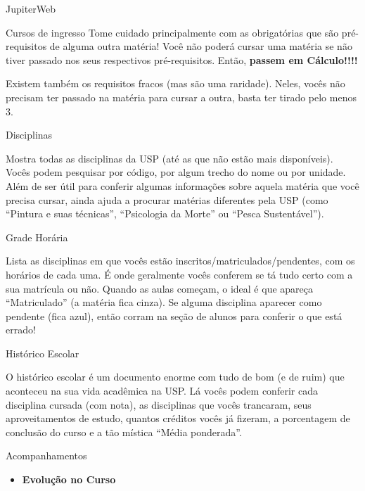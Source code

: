 \begin{secao}{JupiterWeb}
\begin{subsecao}{Cursos de ingresso}
Tome cuidado principalmente com as obrigatórias que são pré-requisitos de
alguma outra matéria! Você não poderá cursar uma matéria se não tiver passado
nos seus respectivos pré-requisitos. Então, \textbf{passem em Cálculo!!!!}

Existem também os requisitos fracos (mas são uma raridade). Neles, vocês não 
precisam ter passado na matéria para cursar a outra, basta ter tirado pelo menos 3.

\end{subsecao}

\begin{subsecao}{Disciplinas}

Mostra todas as disciplinas da USP (até as que não estão mais disponíveis).
Vocês podem pesquisar por código, por algum trecho do nome ou por unidade. 
Além de ser útil para conferir algumas informações sobre aquela matéria que 
você precisa cursar, ainda ajuda a procurar matérias diferentes pela USP 
(como “Pintura e suas técnicas”, “Psicologia da Morte” ou “Pesca Sustentável”).

\end{subsecao}

\begin{subsecao}{Grade Horária}

Lista as disciplinas em que vocês estão inscritos/matriculados/pendentes, com os
horários de cada uma. É onde geralmente vocês conferem se tá tudo certo com a
sua matrícula ou não. Quando as aulas começam, o ideal é que apareça
“Matriculado” (a matéria fica cinza). Se alguma disciplina aparecer como
pendente (fica azul), então corram na seção de alunos para conferir o que está
errado!

\end{subsecao}
\begin{subsecao}{Histórico Escolar}

O histórico escolar é um documento enorme com tudo de bom (e de ruim) que
aconteceu na sua vida acadêmica na USP. Lá vocês podem conferir cada
disciplina cursada (com nota), as disciplinas que vocês trancaram, seus
aproveitamentos de estudo, quantos créditos vocês já fizeram, a porcentagem de
conclusão do curso e a tão mística “Média ponderada”.

\end{subsecao}

\begin{subsecao}{Acompanhamentos}

\begin{itemize}
  \item \textbf{Evolução no Curso}


\end{itemize}
\end{subsecao}
\end{secao}
